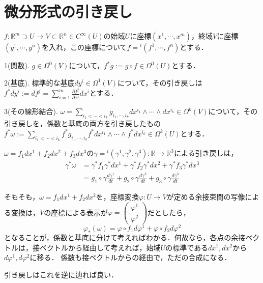 \documentclass[uplatex, dvipdfmx]{jsreport}
\begin{document}
\section{微分形式の引き戻し}

\begin{definition}[微分形式の引き戻し]
    $f:\mathbb{R}^m\supset U\to V\subset\mathbb{R}^n\in C^\infty(U)$の始域$U$に座標$(x^1,\cdots,x^m)$，終域$V$に座標$(y^1,\cdots,y^n)$を入れ，この座標について$f={}^t(f^1,\cdots,f^n)$とする．

    1(関数). $g\in\Omega^0(V)$について，$f^*g:=g\circ f\in\Omega^0(U)$とする．

    2(基底). 標準的な基底$dy^i\in\Omega^1(V)$について，その引き戻しは$f^*dy^i:=df^j=\sum^m_{i=1}\frac{\partial f^j}{\partial x^i}dx^i$とする．

    3(その線形結合). $\omega=\sum_{i_1<\cdots<i_k}g_{i_1,\cdots,i_k}dx^{i_1}\wedge\cdots\wedge dx^{i_k}\in\Omega^k(V)$について，その引き戻しを，係数と基底の両方を引き戻したもの$f^*\omega:=\sum_{i_1<\cdots<i_k}f^*g_{i_1,\cdots,i_k}f^*dx^{i_1}\wedge\cdots\wedge f^*dx^{i_k}\in\Omega^k(U)$とする．
\end{definition}

\begin{example}
    $\omega=f_1dx^1+f_2dx^2+f_3dx^3$の$\gamma={}^t(\gamma^1,\gamma^2,\gamma^3):\mathbb{R}\to\mathbb{R}^3$による引き戻しは，
    \begin{align*}
        \gamma^*\omega &= \gamma^*f_1\gamma^*dx^1 + \gamma^*f_2 \gamma^*dx^2 + \gamma^*f_3\gamma^*dx^3 \\
        &= g_1\circ\gamma \frac{d\gamma^1}{dt} + g_2\circ\gamma \frac{d\gamma^2}{dt} + g_3\circ\gamma \frac{d\gamma^3}{dt}
    \end{align*}
\end{example}
\begin{example}[引き戻しの考え方]
    そもそも，$\omega=f_1dx^1+f_2dx^2$を，座標変換$\varphi:U\to V$が定める余接束間の写像による変換は，$V$の座標による表示が$\varphi=\begin{pmatrix}\varphi^1\\\varphi^2\end{pmatrix}$だとしたら，
    \[\varphi_*(\omega)=\varphi\circ f_1d\varphi^1+\varphi\circ f_2d\varphi^2\]
    となることが，係数と基底に分けて考えればわかる．何故なら，各点の余接ベクトルは，接ベクトルから経由して考えれば，始域$U$の標準である$dx^1,dx^2$から$d\varphi^1,d\varphi^2$に移る．
    係数も接ベクトルからの経由で，ただの合成になる．
    \begin{center}
    \end{center}
    引き戻しはこれを逆に辿れば良い．
\end{example}
\end{document}
